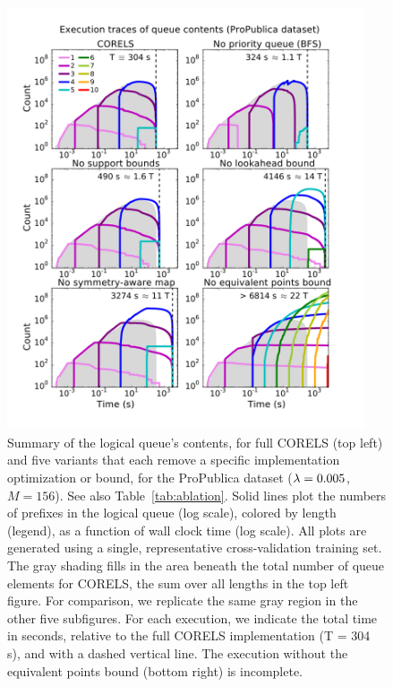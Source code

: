 \begin{figure}[t!]
\begin{center}
\includegraphics[trim={0mm 10mm 0mm 20mm},
width=0.94\textwidth]{figs/kdd_compas_ablation-queue.pdf}
\end{center}
\vspace{-5mm}
\caption{Summary of the logical queue's contents, for full CORELS (top left)
and five variants that each remove a specific implementation optimization or bound,
for the ProPublica dataset (${{\lambda} = 0.005}$, ${M = 156}$).  See also Table~\ref{tab:ablation}.
%
%
Solid lines plot the numbers of prefixes in the logical queue (log scale), colored by length (legend),
as a function of wall clock time (log scale).
%
All plots are generated using a single, representative cross-validation training set.
%
%
The gray shading fills in the area beneath the total number of
queue elements for CORELS,
\ie the sum over all lengths in the top left figure.
%
For comparison, we replicate the same gray region
in the other five subfigures.
%
For each execution, we indicate the total time in seconds,
relative to the full CORELS implementation (T = 304 s),
and with a dashed vertical line.
%
The execution without the equivalent points bound (bottom right) is incomplete.
}
\label{fig:queue}
\end{figure}

